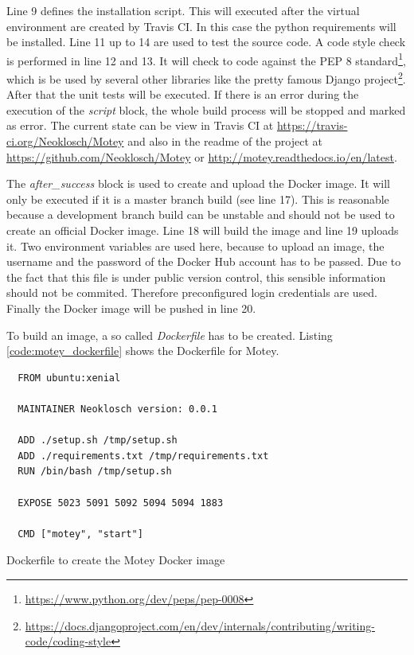 Line 9 defines the installation script.
This will executed after the virtual environment are created by Travis CI.
In this case the python requirements will be installed.
Line 11 up to 14 are used to test the source code.
A code style check is performed in line 12 and 13.
It will check to code against the \ac{PEP} 8 standard\footnote{\url{https://www.python.org/dev/peps/pep-0008}}, which is be used by several other libraries like the pretty famous Django project\footnote{\url{https://docs.djangoproject.com/en/dev/internals/contributing/writing-code/coding-style}}.
After that the unit tests will be executed.
If there is an error during the execution of the \textit{script} block, the whole build process will be stopped and marked as error.
The current state can be view in Travis CI at \url{https://travis-ci.org/Neoklosch/Motey} and also in the readme of the project at \url{https://github.com/Neoklosch/Motey} or \url{http://motey.readthedocs.io/en/latest}.

The \textit{after\_success} block is used to create and upload the Docker image.
It will only be executed if it is a master branch build (see line 17).
This is reasonable because a development branch build can be unstable and should not be used to create an official Docker image.
Line 18 will build the image and line 19 uploads it.
Two environment variables are used here, because to upload an image, the username and the password of the Docker Hub account has to be passed.
Due to the fact that this file is under public version control, this sensible information should not be commited.
Therefore preconfigured login credentials are used.
Finally the Docker image will be pushed in line 20.

To build an image, a so called \textit{Dockerfile} has to be created.
Listing \ref{code:motey_dockerfile} shows the Dockerfile for Motey.

\begin{listing}[H]
  \begin{verbatim}
  FROM ubuntu:xenial

  MAINTAINER Neoklosch version: 0.0.1

  ADD ./setup.sh /tmp/setup.sh
  ADD ./requirements.txt /tmp/requirements.txt
  RUN /bin/bash /tmp/setup.sh

  EXPOSE 5023 5091 5092 5094 5094 1883

  CMD ["motey", "start"]
  \end{verbatim}
  \caption{Dockerfile to create the Motey Docker image}
  \label{code:motey_dockerfile}
\end{listing}

